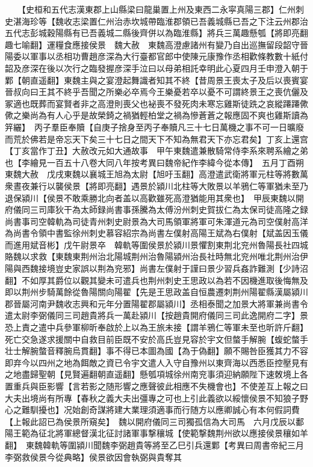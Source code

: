 　　【史桓和五代志漢東郡上山縣梁曰龍巢置上州及東西二永寜真陽三郡】仁州刺史湛海珍等【魏收志梁置仁州治赤坎城帶臨淮郡領已吾義城縣已吾之下注云州郡治五代志彭城穀陽縣有已吾義城二縣後齊併以為臨淮縣】將兵三萬趣懸瓠【將即亮翻趣七喻翻】運糧食應接侯景　魏大赦　東魏高澄慮諸州有變乃自出巡撫留段韶守晉陽委以軍事以丞相功曹趙彦深為大行臺都官郎中使陳元康豫作丞相歡條教數十紙付韶及彦深在後以次行之臨發握彦深手泣曰以母弟相託幸明此心夏四月壬申澄入朝于鄴【朝直遥翻】東魏主與之宴澄起舞識者知其不終【昔周景王喪太子及后以喪賓宴晉叔向曰王其不終乎吾聞之所樂必卒焉今王樂憂若卒以憂不可謂終景王之喪伉儷及冢適也既葬而宴賢者非之高澄則喪父也袐喪不發死肉未寒忘雞斯徒跣之哀縱蹮蹮僛僛之樂尚為有人心乎是故榮錡之禍猶輕柏堂之禍為慘蒼蒼之報應固不爽也雞斯讀為笄纚】　丙子羣臣奉贖【自庚子捨身至丙子奉贖凡三十七日萬機之事不可一日曠廢而荒於佛若是帝忘天下矣三十七日之間天下不知為無君天下亦忘君矣】丁亥上還宫【丁亥當作丁丑】大赦改元如大通故事　甲午東魏遣兼散騎常侍李系來聘系繪之弟也【李繪見一百五十八卷大同八年按考異曰魏帝紀作李緯今從本傳】　五月丁酉朔東魏大赦　戊戌東魏以襄城王旭為太尉【旭吁玉翻】高澄遣武衛將軍元柱等將數萬衆晝夜兼行以襲侯景【將即亮翻】遇景於潁川北柱等大敗景以羊鴉仁等軍猶未至乃退保潁川【侯景不敢乘勝北向者盖以高歡雖死高澄猶能用其衆也】　甲辰東魏以開府儀同三司庫狄干為太師録尚書事孫騰為太傅汾州刺史賀拔仁為太保司徒高隆之録尚書事司空韓軌為司徒青州刺史尉景為大司馬領軍將軍可朱渾道元為司空僕射高洋為尚書令領中書監徐州刺史慕容紹宗為尚書左僕射高陽王斌為右僕射【斌盖因玉儀而進用斌音彬】戊午尉景卒　韓軌等圍侯景於潁川景懼割東荆北兖州魯陽長社四城賂魏以求救【東魏東荆州治北陽城荆州治魯陽潁州治長社時無北兖州唯北荆州治伊陽與西魏接境豈史家誤以荆為兖邪】尚書左僕射于謹曰景少習兵姦詐難測【少詩沼翻】不如厚其爵位以觀其變未可遣兵也荆州刺史王思政以為若不因機進取後悔無及即以荆州步騎萬餘從魯陽關向陽翟【先是王思政盖自恒農遷刺荆州陽翟縣漢屬潁川郡晉屬河南尹魏收志興和元年分置陽翟郡屬潁川】丞相泰聞之加景大將軍兼尚書令遣太尉李弼儀同三司趙貴將兵一萬赴潁川【按趙貴開府儀同三司此逸開府二字】景恐上責之遣中兵參軍柳昕奉啟於上以為王旅未接【謂羊鴉仁等軍未至也昕許斤翻】死亡交急遂求援關中自救目前臣既不安於高氏豈見容於宇文但螫手解腕【蝮蛇螫手壮士解腕螫音釋腕烏貫翻】事不得已本圖為國【為于偽翻】願不賜咎臣獲其力不容即弃今以四州之地為餌敵之資已令宇文遣人入守自豫州以東齊海以西悉臣控壓見有之地盡歸聖朝【見賢遍翻朝直遥翻】懸瓠項城徐州南兖事須迎納願陛下速敇境上各置重兵與臣影響【言若影之随形響之應聲彼此相應不失機會也】不使差互上報之曰大夫出境尚有所專【春秋之義大夫出彊專之可也上引此義欲以綏懷侯景不知狼子野心之難馴擾也】况始創奇謀將建大業理須適事而行随方以應卿誠心有本何假詞費【上報此詔已為侯景所窺矣】　魏以開府儀同三司獨孤信為大司馬　六月戊辰以鄱陽王範為征北將軍總督漢北征討諸軍事撃穰城【使範撃魏荆州欲以應接侯景穰如羊翻】　東魏韓軌等圍潁川聞魏李弼趙貴等將至乙巳引兵還鄴【考異曰周書帝紀三月李弼救侯景今從典略】侯景欲因會執弼與貴奪其

